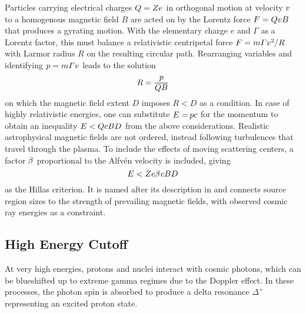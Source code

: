 \begin{spacing}{0.985}
	Particles carrying electrical charges $Q = Ze \kern+0.5pt$ in orthogonal motion at velocity $v \kern+1.0pt$ to a homogenous magnetic
	field $B$ are acted on by the Lorentz force $F = QvB \kern+0.5pt$ that produces a gyrating motion. With the elementary charge $e$ and
	$\varGamma$ as a Lorentz factor, this must balance a relativistic centripetal force $F = m \varGamma v^2 \kern-0.5pt / R$ with Larmor
	radius $R$ on the resulting circular path. Rearranging variables and identifying $p = m \varGamma v \kern+0.5pt$ leads to the solution
	\begin{equation*}
		R = \frac{p}{\raisebox{0.3ex}{$QB \kern+0.3pt$}}
	\end{equation*}
	on which the magnetic field extent $D$ imposes $R < D$ as a condition. In case of highly relativistic energies, one can substitute
	$E = \kern-0.8pt pc$ for the momentum to obtain an inequality $E < QcBD \kern+0.5pt$ from the above considerations. Realistic astrophysical
	magnetic fields are not ordered, instead following turbulences that travel through the plasma. To include the effects of moving scattering
	centers, a factor $\kern-0.5pt \beta \kern+0.5pt$ proportional to the Alfvén velocity is included, giving
	\begin{equation*}
		E < Ze \kern-0.3pt \beta \kern+0.9pt cBD
		\label{eqn:hillas}
	\end{equation*}
	as the Hillas criterion. It is named after its description in \cite{Hillas_1984} and connects source region sizes to the strength of
	prevailing magnetic fields, with observed cosmic ray energies as a constraint.
	
	
	
	\subsection{High Energy Cutoff}
	\label{sub:cutoff}
	
	At very high energies, protons and nuclei interact with cosmic photons, which can be blueshifted up to extreme gamma regimes due to
	the Doppler effect. In these processes, the photon spin is absorbed to produce a delta resonance $\Delta^+$ representing an excited
	proton state.
	\enlargethispage*{\baselineskip}\newpage
\end{spacing}

